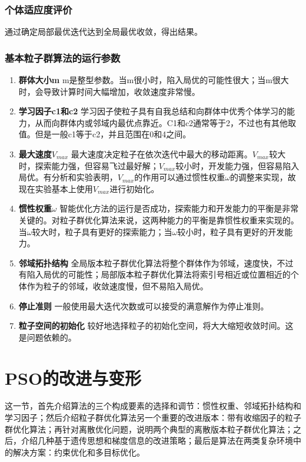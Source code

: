 \subsubsection{个体适应度评价}
通过确定局部最优迭代达到全局最优收敛，得出结果。
\subsubsection{基本粒子群算法的运行参数}
\begin{enumerate}
	\item \textbf{群体大小m}
	\noindent m是整型参数。当m很小时，陷入局优的可能性很大；当m很大时，会导致计算时间大幅增加，收敛速度非常慢。
	\item \textbf{学习因子c1和c2}
	\noindent 学习因子使粒子具有自我总结和向群体中优秀个体学习的能力，从而向群体内或邻域内最优点靠近。C1和c2通常等于2，不过也有其他取值。但是一般c1等于c2，并且范围在0和4之间。
	\item \textbf{最大速度$V_{max}$}
	\noindent 最大速度决定粒子在依次迭代中最大的移动距离。$V_{max}$较大时，探索能力强，但容易飞过最好解；$V_{max}$较小时，开发能力强，但容易陷入局优。有分析和实验表明，$V_{max}$的作用可以通过惯性权重$\omega$的调整来实现，故现在实验基本上使用$V_{max}$进行初始化。
	\item \textbf{惯性权重$\omega$}
	\noindent 智能优化方法的运行是否成功，探索能力和开发能力的平衡是非常关键的。对粒子群优化算法来说，这两种能力的平衡是靠惯性权重来实现的。当$\omega$较大时，粒子具有更好的探索能力；当$\omega$较小时，粒子具有更好的开发能力。
	\item \textbf{邻域拓扑结构}
	\noindent 全局版本粒子群优化算法将整个群体作为邻域，速度快，不过有陷入局优的可能性；局部版本粒子群优化算法将索引号相近或位置相近的个体作为粒子的邻域，收敛速度慢，但不易陷入局优。
	\item \textbf{停止准则}
	\noindent 一般使用最大迭代次数或可以接受的满意解作为停止准则。
	\item \textbf{粒子空间的初始化}
	\noindent 较好地选择粒子的初始化空间，将大大缩短收敛时间。这是问题依赖的。
\end{enumerate}
\section{PSO的改进与变形}
这一节，首先介绍算法的三个构成要素的选择和调节：惯性权重、邻域拓扑结构和学习因子；然后介绍粒子群优化算法另一个重要的改进版本：带有收缩因子的粒子群优化算法；再针对离散优化问题，说明两个典型的离散版本粒子群优化算法；之后，介绍几种基于遗传思想和梯度信息的改进策略；最后是算法在两类复杂环境中的解决方案：约束优化和多目标优化。
